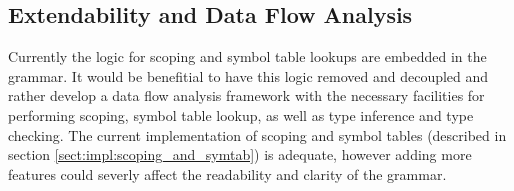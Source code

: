 \subsection{Extendability and Data Flow Analysis}
\label{sect:discussion:ast:extend}
Currently the logic for scoping and symbol table lookups are embedded in the
grammar. It would be benefitial to have this logic removed and decoupled and
rather develop a data flow analysis framework with the necessary facilities for
performing scoping, symbol table lookup, as well as type inference and type
checking. The current implementation of scoping and symbol tables (described in
section \ref{sect:impl:scoping_and_symtab}) is adequate, however adding more
features could severly affect the readability and clarity of the grammar.
